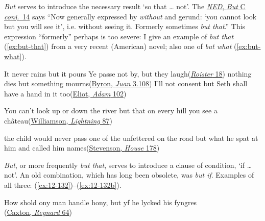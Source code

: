 \textit{But} serves to introduce the necessary result `so that {\dots} not'. The \href{https://archive.org/details/in.ernet.dli.2015.211152/page/n1239/mode/2up?view=theater}{\textit{NED}, \textit{But} C \textit{conj.}~14} says ``Now generally expressed by \textit{without} and gerund: `you cannot look but you will see it', i.e. without seeing it. Formerly sometimes \textit{but that}.'' This expression ``formerly'' perhaps is too severe: I give %
an example of \textit{but that} (\ref{ex:but-that}) from a very recent (American) novel; also one of \textit{but what} (\ref{ex:but-what}).

\ea \label{ex:12-126}
\ea
It never rains but it pours
\ex
Ye passe not by, but they laugh\hfill(\href{https://archive.org/details/roisterdoister00udalgoog/page/n24/mode/2up?view=theater&q=%22Ye+paffe+not+by%22}{\textit{Roister} 18})
\ex
nothing dies but something mourns\hfill(\href{https://archive.org/details/workslordbyron10unkngoog/page/180/mode/2up?view=theater&q=%22nothing+dies+but%22}{Byron, \textit{Juan} 3.108})
\ex
I'll not consent but Seth shall have a hand in it too\hfill(\href{https://archive.org/details/adambede00eliouoft/page/n113/mode/2up?q=%22consent+but+Seth%22&view=theater}{Eliot, \textit{Adam} 102})
\z
\z

\ea \label{ex:but-that}
You can't look up or down the river but that on every hill you see a château\hfill(\href{https://archive.org/details/lightningconduct00williala/page/104/mode/2up?q=%22look+up+or+down+the+river%22&view=theater}{Williamson, \textit{Lightning} 87})
\z

\ea \label{ex:but-what}
the child would never pass one of the unfettered on the road but what he spat at him and called him names\hfill(\href{https://archive.org/details/dli.ministry.23383/page/177/mode/2up?q=%22child+would+never+pass+one%22&view=theater}{Stevenson, \textit{House} 178}) %
\z

\bigskip
\textit{But}, or more frequently \textit{but that}, serves to introduce a clause of condition, `if {\dots} not'. An old combination, which has long been obsolete, was \textit{but if}. Examples of all three: (\ref{ex:12-132})--(\ref{ex:12-132b}).

\ea \label{ex:12-132}
How shold ony man handle hony, but yf he lycked his fyngres\\\hfill(\href{https://archive.org/details/TheHistoryOfReynardTheFoxArber/page/n93/mode/2up?q=%22man+handle+hony%22&view=theater}{Caxton, \textit{Reynard} 64})
\z


